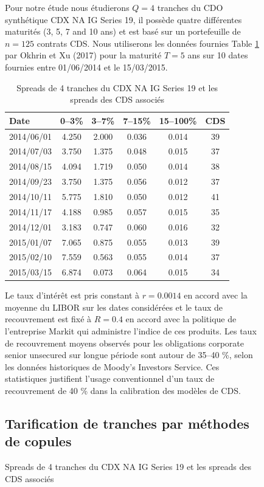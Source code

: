 \begin{figure}[H]
Pour notre étude nous étudierons $Q = 4$ tranches du CDO synthétique
CDX NA IG Series 19, il possède quatre différentes maturités (3, 5, 7
and 10 ans) et est basé sur un portefeuille de $n = 125$ contrats CDS.
Nous utiliserons les données fournies Table \ref{tab:OkhrinXu} par Okhrin et Xu (2017) pour la
maturité $T = 5$ ans sur 10 dates fournies entre 01/06/2014 et le 
15/03/2015.

\begin{table}[H]
\centering
\begin{tabular}{lccccc}
\toprule
Date & 0--3\% & 3--7\% & 7--15\% & 15--100\% & CDS \\
\midrule
2014/06/01 & 4.250 & 2.000 & 0.036 & 0.014 & 39 \\
2014/07/03 & 3.750 & 1.375 & 0.048 & 0.015 & 37 \\
2014/08/15 & 4.094 & 1.719 & 0.050 & 0.014 & 38 \\
2014/09/23 & 3.750 & 1.375 & 0.056 & 0.012 & 37 \\
2014/10/11 & 5.775 & 1.810 & 0.050 & 0.012 & 41 \\
2014/11/17 & 4.188 & 0.985 & 0.057 & 0.015 & 35 \\
2014/12/01 & 3.183 & 0.747 & 0.060 & 0.016 & 32 \\
2015/01/07 & 7.065 & 0.875 & 0.055 & 0.013 & 39 \\
2015/02/10 & 7.559 & 0.563 & 0.055 & 0.014 & 37 \\
2015/03/15 & 6.874 & 0.073 & 0.064 & 0.015 & 34 \\
\bottomrule
\end{tabular}
\caption{Spreads de 4 tranches du CDX NA IG Series 19 et les spreads des CDS associés}
\label{tab:OkhrinXu}
\end{table}

Le taux d'intérêt est pris constant à $r = 0.0014$ en accord avec la moyenne du LIBOR sur les
dates considérées et le taux de recouvrement est fixé à $R = 0.4$ en accord avec
la politique de l'entreprise Markit qui administre l'indice de ces produits. \cite{OhkrinXu}
Les taux de recouvrement moyens observés pour les obligations corporate senior unsecured sur 
longue période sont autour de 35--40 \%, selon les données historiques de Moody's Investors Service. Ces statistiques justifient l'usage conventionnel
d'un taux de recouvrement de 40 \% dans la calibration des modèles de CDS. \cite{Tresor}


\subsection{Tarification de tranches par méthodes de copules}


\end{figure}
